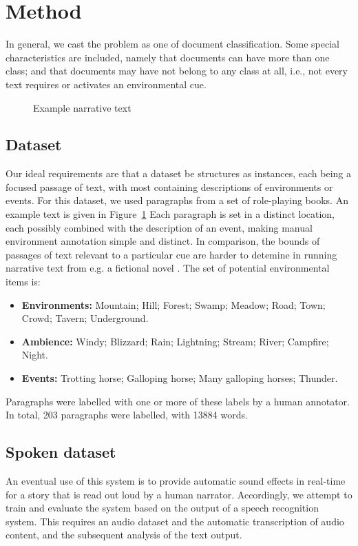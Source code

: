 \documentclass[10pt,a4paper]{article}
\begin{document}
\section{Method}

In general, we cast the problem as one of document classification.
Some special characteristics are included, namely that documents can have more than one class; and that documents may have not belong to any class at all, i.e., not every text requires or activates an environmental cue.

\begin{figure}
\centering
\label{fig:ff-para}
\caption{Example narrative text}
\end{figure}

\subsection{Dataset}
Our ideal requirements are that a dataset be structures as instances, each being a focused passage of text, with most containing descriptions of environments or events.
For this dataset, we used paragraphs from a set of role-playing books.%
An example text is given in Figure~\ref{fig:ff-para}
Each paragraph is set in a distinct location, each possibly combined with the description of an event, making manual environment annotation simple and distinct.
In comparison, the bounds of passages of text relevant to a particular cue are harder to detemine in running narrative text from e.g. a fictional novel .
The set of potential environmental items is:

\begin{itemize}
\item {\bf Environments:} Mountain; Hill; Forest; Swamp; Meadow; Road; Town; Crowd; Tavern; Underground.
\item {\bf Ambience:} Windy; Blizzard; Rain; Lightning; Stream; River; Campfire; Night.
\item {\bf Events:} Trotting horse; Galloping horse; Many galloping horses; Thunder.
\end{itemize}

Paragraphs were labelled with one or more of these labels by a human annotator.
In total, 203 paragraphs were labelled, with 13884 words.

\subsection{Spoken dataset}
An eventual use of this system is to provide automatic sound effects in real-time for a story that is read out loud by a human narrator.
Accordingly, we attempt to train and evaluate the system based on the output of a speech recognition system.
This requires an audio dataset and the automatic transcription of audio content, and the subsequent analysis of the text output.
\end{document}
